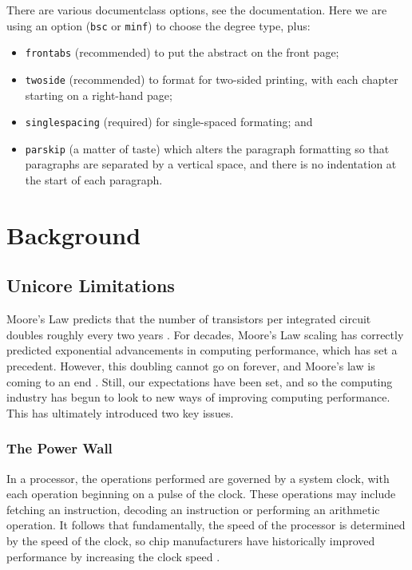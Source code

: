 \documentclass[bsc,frontabs,singlespacing,parskip,deptreport]{infthesis}     %
\begin{document}
There are various documentclass options, see the documentation.  Here we are
using an option ({\tt bsc} or {\tt minf}) to choose the degree type, plus:
\begin{itemize}
\item {\tt frontabs} (recommended) to put the abstract on the front page;
\item {\tt twoside} (recommended) to format for two-sided printing, with
  each chapter starting on a right-hand page;
\item {\tt singlespacing} (required) for single-spaced formating; and
\item {\tt parskip} (a matter of taste) which alters the paragraph formatting so that
paragraphs are separated by a vertical space, and there is no
indentation at the start of each paragraph.
\end{itemize}

\chapter{Background}

\section{Unicore Limitations} \label{unicore-limitations}
Moore’s Law predicts that the number of transistors per integrated circuit doubles roughly every two years \cite{moore_1998} \cite{moore_2006}. For decades, Moore’s Law scaling has correctly predicted exponential advancements in computing performance, which has set a precedent. However, this doubling cannot go on forever, and Moore’s law is coming to an end \cite{DBLP:journals/cse/TheisW17}. Still, our expectations have been set, and so the computing industry has begun to look to new ways of improving computing performance. This has ultimately introduced two key issues.

\subsection{The Power Wall} \label{the-power-wall}
In a processor, the operations performed are governed by a system clock, with each operation beginning on a pulse of the clock. These operations may include fetching an instruction, decoding an instruction or performing an arithmetic operation. It follows that fundamentally, the speed of the processor is determined by the speed of the clock, so chip manufacturers have historically improved performance by increasing the clock speed \cite{stallings}.
\end{document}

